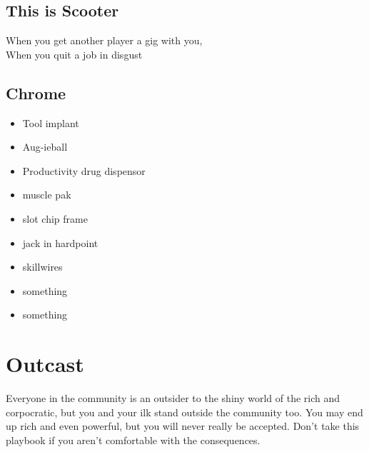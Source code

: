 \documentclass{tufte-book}
\begin{document}
\subsection{This is Scooter}
When you get another player a gig with you, \\
When you quit a job in disgust 


\subsection{Chrome}
\begin{multicols}{3}
\begin{itemize}
\item Tool implant
\item Aug-ieball
\item Productivity drug dispensor
\item muscle pak
\item slot chip frame
\item jack in hardpoint
\item skillwires
\item something
\item something
\end{itemize}
\end{multicols}




\section{Outcast} \label{sec:Outcast}

Everyone in the community is an outsider to the shiny world of the rich and corpocratic, but you and your ilk stand outside the community too. You may end up rich and even powerful, but you will never really be accepted. Don't take this playbook if you aren't comfortable with the consequences.

\end{document}
